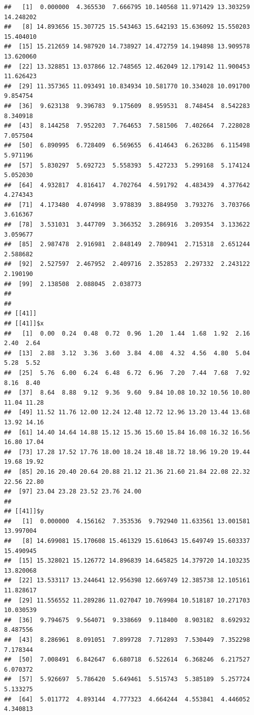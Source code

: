\documentclass[
  ignorenonframetext,
]{beamer}
\begin{document}
\begin{frame}[fragile]{}
\begin{verbatim}
##   [1]  0.000000  4.365530  7.666795 10.140568 11.971429 13.303259 14.248202
##   [8] 14.893656 15.307725 15.543463 15.642193 15.636092 15.550203 15.404010
##  [15] 15.212659 14.987920 14.738927 14.472759 14.194898 13.909578 13.620060
##  [22] 13.328851 13.037866 12.748565 12.462049 12.179142 11.900453 11.626423
##  [29] 11.357365 11.093491 10.834934 10.581770 10.334028 10.091700  9.854754
##  [36]  9.623138  9.396783  9.175609  8.959531  8.748454  8.542283  8.340918
##  [43]  8.144258  7.952203  7.764653  7.581506  7.402664  7.228028  7.057504
##  [50]  6.890995  6.728409  6.569655  6.414643  6.263286  6.115498  5.971196
##  [57]  5.830297  5.692723  5.558393  5.427233  5.299168  5.174124  5.052030
##  [64]  4.932817  4.816417  4.702764  4.591792  4.483439  4.377642  4.274343
##  [71]  4.173480  4.074998  3.978839  3.884950  3.793276  3.703766  3.616367
##  [78]  3.531031  3.447709  3.366352  3.286916  3.209354  3.133622  3.059677
##  [85]  2.987478  2.916981  2.848149  2.780941  2.715318  2.651244  2.588682
##  [92]  2.527597  2.467952  2.409716  2.352853  2.297332  2.243122  2.190190
##  [99]  2.138508  2.088045  2.038773
## 
## 
## [[41]]
## [[41]]$x
##   [1]  0.00  0.24  0.48  0.72  0.96  1.20  1.44  1.68  1.92  2.16  2.40  2.64
##  [13]  2.88  3.12  3.36  3.60  3.84  4.08  4.32  4.56  4.80  5.04  5.28  5.52
##  [25]  5.76  6.00  6.24  6.48  6.72  6.96  7.20  7.44  7.68  7.92  8.16  8.40
##  [37]  8.64  8.88  9.12  9.36  9.60  9.84 10.08 10.32 10.56 10.80 11.04 11.28
##  [49] 11.52 11.76 12.00 12.24 12.48 12.72 12.96 13.20 13.44 13.68 13.92 14.16
##  [61] 14.40 14.64 14.88 15.12 15.36 15.60 15.84 16.08 16.32 16.56 16.80 17.04
##  [73] 17.28 17.52 17.76 18.00 18.24 18.48 18.72 18.96 19.20 19.44 19.68 19.92
##  [85] 20.16 20.40 20.64 20.88 21.12 21.36 21.60 21.84 22.08 22.32 22.56 22.80
##  [97] 23.04 23.28 23.52 23.76 24.00
## 
## [[41]]$y
##   [1]  0.000000  4.156162  7.353536  9.792940 11.633561 13.001581 13.997004
##   [8] 14.699081 15.170608 15.461329 15.610643 15.649749 15.603337 15.490945
##  [15] 15.328021 15.126772 14.896839 14.645825 14.379720 14.103235 13.820068
##  [22] 13.533117 13.244641 12.956398 12.669749 12.385738 12.105161 11.828617
##  [29] 11.556552 11.289286 11.027047 10.769984 10.518187 10.271703 10.030539
##  [36]  9.794675  9.564071  9.338669  9.118400  8.903182  8.692932  8.487556
##  [43]  8.286961  8.091051  7.899728  7.712893  7.530449  7.352298  7.178344
##  [50]  7.008491  6.842647  6.680718  6.522614  6.368246  6.217527  6.070372
##  [57]  5.926697  5.786420  5.649461  5.515743  5.385189  5.257724  5.133275
##  [64]  5.011772  4.893144  4.777323  4.664244  4.553841  4.446052  4.340813

\end{verbatim}
\end{frame}
\end{document}
